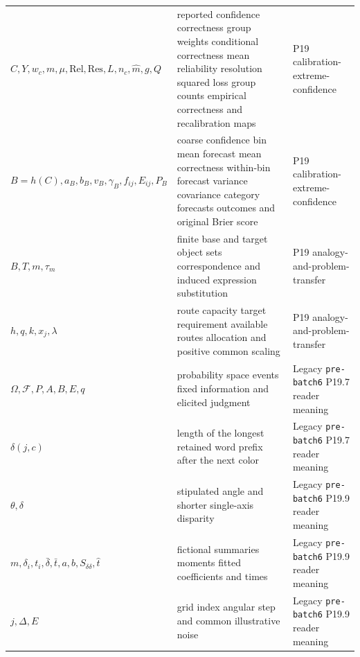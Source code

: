 \begin{longtable}{@{}p{}p{}p{}@{}}
\(C,\allowbreak Y,\allowbreak w_c,\allowbreak m,\allowbreak \mu,\allowbreak \mathrm{Rel},\allowbreak \mathrm{Res},\allowbreak L,\allowbreak n_c,\allowbreak \widehat m,\allowbreak g,\allowbreak Q\) & reported confidence correctness group weights conditional correctness mean reliability resolution squared loss group counts empirical correctness and recalibration maps & P19 calibration-\allowbreak{}extreme-\allowbreak{}confidence \\
\(B=h(C),\allowbreak a_B,\allowbreak b_B,\allowbreak v_B,\allowbreak \gamma_B,\allowbreak f_{ij},\allowbreak E_{ij},\allowbreak P_B\) & coarse confidence bin mean forecast mean correctness within-bin forecast variance covariance category forecasts outcomes and original Brier score & P19 calibration-\allowbreak{}extreme-\allowbreak{}confidence \\
\(B,\allowbreak T,\allowbreak m,\allowbreak \tau_m\) & finite base and target object sets correspondence and induced expression substitution & P19 analogy-\allowbreak{}and-\allowbreak{}problem-\allowbreak{}transfer \\
\(h,\allowbreak q,\allowbreak k,\allowbreak x_j,\allowbreak \lambda\) & route capacity target requirement available routes allocation and positive common scaling & P19 analogy-\allowbreak{}and-\allowbreak{}problem-\allowbreak{}transfer \\
\(\Omega,\allowbreak \mathcal F,\allowbreak P,\allowbreak A,\allowbreak B,\allowbreak E,\allowbreak q\) & probability space events fixed information and elicited judgment & Legacy \texttt{pre-\allowbreak{}batch6} P19.\allowbreak{}7 reader meaning \\
\(\delta(j,\allowbreak c)\) & length of the longest retained word prefix after the next color & Legacy \texttt{pre-\allowbreak{}batch6} P19.\allowbreak{}7 reader meaning \\
\(\theta,\allowbreak \delta\) & stipulated angle and shorter single-axis disparity & Legacy \texttt{pre-\allowbreak{}batch6} P19.\allowbreak{}9 reader meaning \\
\(m,\allowbreak \delta_i,\allowbreak t_i,\allowbreak \bar\delta,\allowbreak \bar t,\allowbreak a,\allowbreak b,\allowbreak S_{\delta\delta},\allowbreak \widehat t\) & fictional summaries moments fitted coefficients and times & Legacy \texttt{pre-\allowbreak{}batch6} P19.\allowbreak{}9 reader meaning \\
\(j,\allowbreak \Delta,\allowbreak E\) & grid index angular step and common illustrative noise & Legacy \texttt{pre-\allowbreak{}batch6} P19.\allowbreak{}9 reader meaning \\

\end{longtable}
